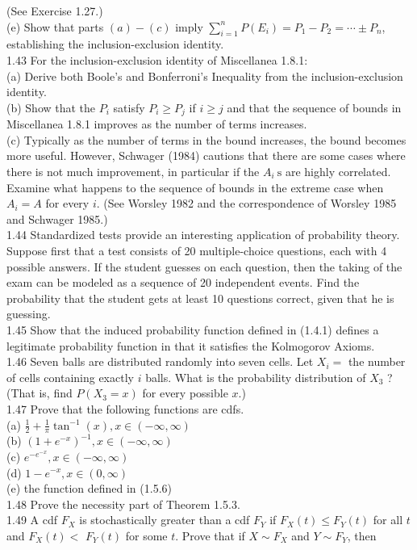 \documentclass[10pt]{article}
\begin{document}
(See Exercise 1.27.)\\
(e) Show that parts $(a)-(c)$ imply $\sum_{i=1}^{n} P\left(E_{i}\right)=P_{1}-P_{2}=\cdots \pm P_{n}$, establishing the inclusion-exclusion identity.\\
1.43 For the inclusion-exclusion identity of Miscellanea 1.8.1:\\
(a) Derive both Boole's and Bonferroni's Inequality from the inclusion-exclusion identity.\\
(b) Show that the $P_{i}$ satisfy $P_{i} \geq P_{j}$ if $i \geq j$ and that the sequence of bounds in Miscellanea 1.8.1 improves as the number of terms increases.\\
(c) Typically as the number of terms in the bound increases, the bound becomes more useful. However, Schwager (1984) cautions that there are some cases where there is not much improvement, in particular if the $A_{i} \mathrm{~s}$ are highly correlated. Examine what happens to the sequence of bounds in the extreme case when $A_{i}=A$ for every $i$. (See Worsley 1982 and the correspondence of Worsley 1985 and Schwager 1985.)\\
1.44 Standardized tests provide an interesting application of probability theory. Suppose first that a test consists of 20 multiple-choice questions, each with 4 possible answers. If the student guesses on each question, then the taking of the exam can be modeled as a sequence of 20 independent events. Find the probability that the student gets at least 10 questions correct, given that he is guessing.\\
1.45 Show that the induced probability function defined in (1.4.1) defines a legitimate probability function in that it satisfies the Kolmogorov Axioms.\\
1.46 Seven balls are distributed randomly into seven cells. Let $X_{i}=$ the number of cells containing exactly $i$ balls. What is the probability distribution of $X_{3}$ ? (That is, find $P\left(X_{3}=x\right)$ for every possible $x$.)\\
1.47 Prove that the following functions are cdfs.\\
(a) $\frac{1}{2}+\frac{1}{\pi} \tan ^{-1}(x), x \in(-\infty, \infty)$\\
(b) $\left(1+e^{-x}\right)^{-1}, x \in(-\infty, \infty)$\\
(c) $e^{-e^{-x}}, x \in(-\infty, \infty)$\\
(d) $1-e^{-x}, x \in(0, \infty)$\\
(e) the function defined in (1.5.6)\\
1.48 Prove the necessity part of Theorem 1.5.3.\\
1.49 A cdf $F_{X}$ is stochastically greater than a cdf $F_{Y}$ if $F_{X}(t) \leq F_{Y}(t)$ for all $t$ and $F_{X}(t)<$ $F_{Y}(t)$ for some $t$. Prove that if $X \sim F_{X}$ and $Y \sim F_{Y}$, then
\end{document}
